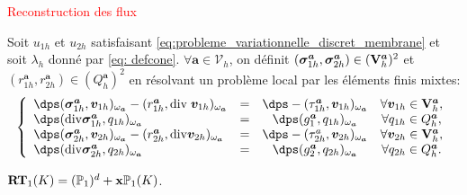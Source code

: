 \documentclass{beamer}
\renewcommand{\div}{\mathrm{div}}
\begin{document}
\begin{frame}
\textcolor{red}{Reconstruction des flux}
\begin{definition}
Soit $u_{1h}$ et $u_{2h}$ satisfaisant \eqref{eq:probleme_variationnelle_discret_membrane} et soit $\lambda_h$ donné par \eqref{eq: defcone}.
$\forall {\bm a} \in {\mathcal{V}}_h$, on définit $({\bm{\sigma}}_{1h}^{\bm a},{\bm{\sigma}}_{2h}^{\bm a}) \in ({\bf V}_h^{\bm a})^2$  et $(r_{1h}^{\bm a},r_{2h}^{\bm a})\in (Q_h^{\bm a})^2$ en résolvant un problème local par les éléments finis mixtes:
\begin{equation}
\left\lbrace\begin{array}{llccc}
\dps ({\bm{\sigma}}_{1h}^{\bm a},{\bm v}_{1h})_{{\omega}_{\bm a}}-(r_{1h}^{\bm a},\div \hspace{0.1 cm} {\bm v}_{1h})_{{\omega}_{\bm a}} &=& \dps -({\mathcal{\tau}}_{1h}^{\bm a},{\bm v}_{1h})_{\omega_{\bm a}} & \forall {\bm v}_{1h}\in {\bf V}_h^{\bm a}, \\
\dps (\div {\bm{\sigma}}_{1h}^{\bm a},q_{1h})_{\omega_{\bm a}}&=& \dps(g_{\mathrm{1}}^{\bm a},q_{1h})_{\omega_{\bm a}} & \forall  q_{1h} \in Q_h^{\bm a},\\
\dps ({\bm{\sigma}}_{2h}^{\bm a},{\bm v}_{2h})_{\omega_{\bm a}}-(r_{2h}^{\bm a},\div {\bm v}_{2h})_{\omega_{\bm a}} &=& \dps -({\mathcal{\tau}}_{2h}^a,{\bm v}_{2h})_{\omega_{\bm a}} &\forall {\bm v}_{2h} \in {\bf V}_h^{\bm a},\\
\dps(\div {\bm{\sigma}}_{2h}^{\bm a},q_{2h})_{\omega_{\bm a}}&=&\dps(g_{\mathrm{2}}^{\bm a},q_{2h})_{\omega_{\bm a}} & \forall q_{2h} \in Q_h^{\bm a}.
\end{array}
\right.
\label{eq:reconstruction_flux_raviart_thomas}
\end{equation}
\end{definition}
\begin{definition}
$\textbf{RT}_1(K)=({\mathbb{P}}_1)^d + {\bf x} {\mathbb{P}}_1(K)$.
\end{definition}
\end{frame}
\end{document}
